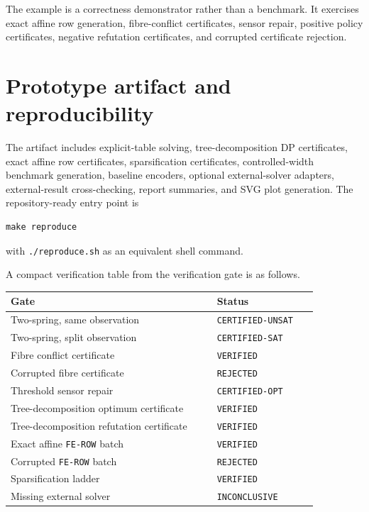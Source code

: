 \documentclass[11pt]{article}
\theoremstyle{plain}
\theoremstyle{definition}
\theoremstyle{remark}
\begin{document}
The example is a correctness demonstrator rather than a benchmark.  It exercises
exact affine row generation, fibre-conflict certificates, sensor repair,
positive policy certificates, negative refutation certificates, and corrupted
certificate rejection.

\section{Prototype artifact and reproducibility}
\label{sec:artifact}

The artifact includes explicit-table solving, tree-decomposition DP
certificates, exact affine row certificates, sparsification certificates,
controlled-width benchmark generation, baseline encoders, optional
external-solver adapters, external-result cross-checking, report summaries, and
SVG plot generation.  The repository-ready entry point is
\begin{verbatim}
make reproduce
\end{verbatim}
with \texttt{./reproduce.sh} as an equivalent shell command.

A compact verification table from the verification gate is as follows.
\begin{center}
\begin{tabular}{@{}p{0.58\linewidth}p{0.28\linewidth}@{}}
\toprule
Gate & Status\\
\midrule
Two-spring, same observation & \texttt{CERTIFIED-UNSAT}\\
Two-spring, split observation & \texttt{CERTIFIED-SAT}\\
Fibre conflict certificate & \texttt{VERIFIED}\\
Corrupted fibre certificate & \texttt{REJECTED}\\
Threshold sensor repair & \texttt{CERTIFIED-OPT}\\
Tree-decomposition optimum certificate & \texttt{VERIFIED}\\
Tree-decomposition refutation certificate & \texttt{VERIFIED}\\
Exact affine \texttt{FE-ROW} batch & \texttt{VERIFIED}\\
Corrupted \texttt{FE-ROW} batch & \texttt{REJECTED}\\
Sparsification ladder & \texttt{VERIFIED}\\
Missing external solver & \texttt{INCONCLUSIVE}\\
\bottomrule
\end{tabular}
\end{center}
\end{document}
